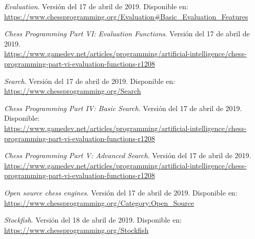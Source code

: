 \documentclass[letterpaper,12pt]{article}
\begin{document}
\begin{thebibliography}{99}
\textit{Evaluation}. Versión del 17 de abril de 2019. Disponible en: \\
\url{https://www.chessprogramming.org/Evaluation#Basic_Evaluation_Features}

\textit{Chess Programming Part VI: Evaluation Functions}. Versión del 17 de abril de 2019.
\\ \url{https://www.gamedev.net/articles/programming/artificial-intelligence/chess-programming-part-vi-evaluation-functions-r1208}

\textit{Search}. Versión del 17 de abril de 2019. Disponible en: \\
\url{https://www.chessprogramming.org/Search}

\textit{Chess Programming Part IV: Basic Search}. Versión del 17 de abril de 2019.
Disponible: \\ \url{https://www.gamedev.net/articles/programming/artificial-intelligence/chess-programming-part-vi-evaluation-functions-r1208}

\textit{Chess Programming Part V: Advanced Search}. Versión del 17 de abril de 2019. \\
\url{https://www.gamedev.net/articles/programming/artificial-intelligence/chess-programming-part-vi-evaluation-functions-r1208}


\textit{Open source chess engines}. Versión del 17 de abril de 2019. Disponible en: \\
\url{https://www.chessprogramming.org/Category:Open_Source}

\textit{Stockfish}. Versión del 18 de abril de 2019. Disponible en: \\
\url{https://www.chessprogramming.org/Stockfish}

\end{thebibliography}
\end{document}
